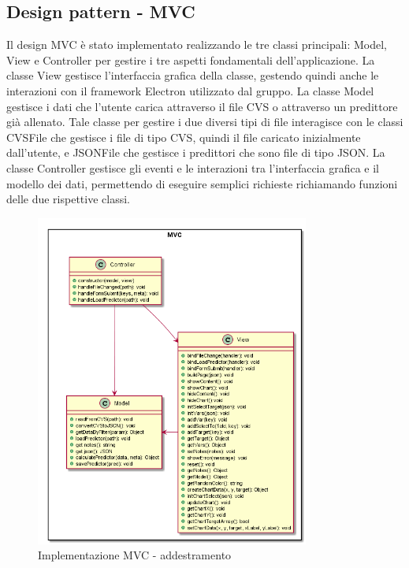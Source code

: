 \documentclass[../manuale-sviluppatore.tex]{subfiles}
\begin{document}
\subsection{Design pattern - MVC}
\label{ssec:design_pattern_mvc}
Il design MVC è stato implementato realizzando le tre classi principali: Model, View e Controller per gestire i tre aspetti fondamentali dell'applicazione.
La classe View gestisce l'interfaccia grafica della classe, gestendo quindi anche le interazioni con il framework Electron utilizzato dal gruppo.
La classe Model gestisce i dati che l'utente carica attraverso il file CVS o attraverso un predittore già allenato. Tale classe per gestire i due diversi tipi di file interagisce con le classi
CVSFile che gestisce i file di tipo CVS, quindi il file caricato inizialmente dall'utente, e JSONFile che gestisce i predittori che sono file di tipo JSON.
La classe Controller gestisce gli eventi e le interazioni tra l'interfaccia grafica e il modello dei dati, permettendo di eseguire semplici richieste richiamando funzioni delle due rispettive classi.

\begin{figure}[H]
    \begin{center}
         \includegraphics[width=9cm]{img/mvcTA.png}
         \caption{Implementazione MVC - addestramento}
         \label{fig:MVC}
     \end{center}
 \end{figure}
\end{document}
